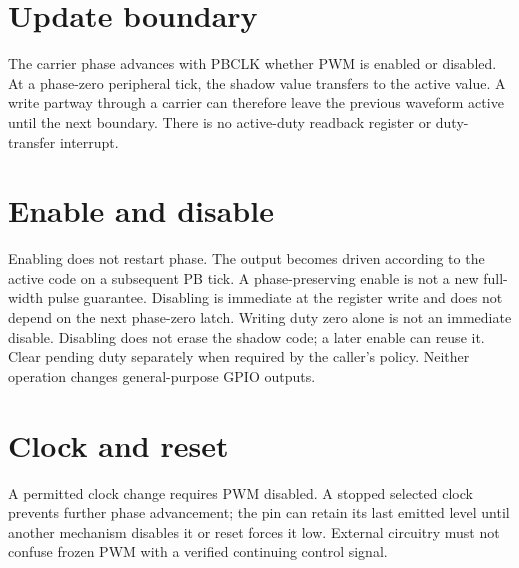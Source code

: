 \documentclass[10pt]{article}
\begin{document}
\section*{Update boundary}
The carrier phase advances with PBCLK whether PWM is enabled or disabled. At a phase-zero peripheral tick, the shadow value transfers to the active value. A write partway through a carrier can therefore leave the previous waveform active until the next boundary. There is no active-duty readback register or duty-transfer interrupt.
\begin{center}
\end{center}
\section*{Enable and disable}
Enabling does not restart phase. The output becomes driven according to the active code on a subsequent PB tick. A phase-preserving enable is not a new full-width pulse guarantee. Disabling is immediate at the register write and does not depend on the next phase-zero latch.
Writing duty zero alone is not an immediate disable. Disabling does not erase the shadow code; a later enable can reuse it. Clear pending duty separately when required by the caller's policy. Neither operation changes general-purpose GPIO outputs.
\section*{Clock and reset}
A permitted clock change requires PWM disabled. A stopped selected clock prevents further phase advancement; the pin can retain its last emitted level until another mechanism disables it or reset forces it low. External circuitry must not confuse frozen PWM with a verified continuing control signal.

\newpage
{}
\end{document}
